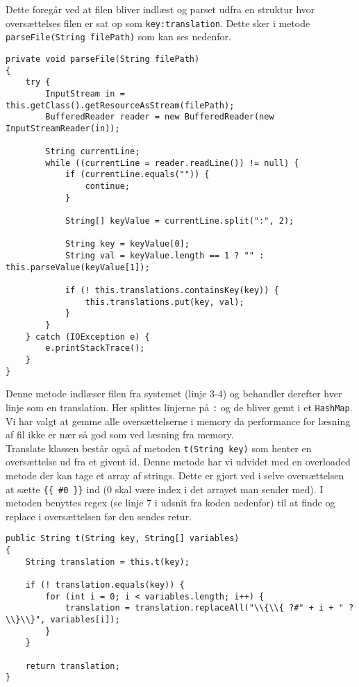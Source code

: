\noindent Dette foregår ved at filen bliver indlæst og parset udfra en struktur hvor oversættelses filen er sat op som \lstinline{key:translation}.
Dette sker i metode \lstinline{parseFile(String filePath)} som kan ses nedenfor.

\begin{lstlisting}
private void parseFile(String filePath)
{
    try {
        InputStream in = this.getClass().getResourceAsStream(filePath);
        BufferedReader reader = new BufferedReader(new InputStreamReader(in));

        String currentLine;
        while ((currentLine = reader.readLine()) != null) {
            if (currentLine.equals("")) {
                continue;
            }

            String[] keyValue = currentLine.split(":", 2);

            String key = keyValue[0];
            String val = keyValue.length == 1 ? "" : this.parseValue(keyValue[1]);

            if (! this.translations.containsKey(key)) {
                this.translations.put(key, val);
            }
        }
    } catch (IOException e) {
        e.printStackTrace();
    }
}
\end{lstlisting}
\vspace{2ex}

\noindent Denne metode indlæser filen fra systemet (linje 3-4) og behandler derefter hver linje som en translation.
Her splittes linjerne på \lstinline{:} og de bliver gemt i et \lstinline{HashMap}.
Vi har valgt at gemme alle oversættelserne i memory da performance for læsning af fil ikke er nær så god som ved læsning fra memory.
\\

\noindent Translate klassen består også af metoden \lstinline{t(String key)} som henter en oversættelse ud fra et givent id.
Denne metode har vi udvidet med en overloaded metode der kan tage et array af strings.
Dette er gjort ved i selve oversættelsen at sætte \lstinline!{{ #0 }}! ind (0 skal være index i det arrayet man sender med).
I metoden benyttes regex (se linje 7 i udsnit fra koden nedenfor) til at finde og replace i oversættelsen før den sendes retur.

\begin{lstlisting}
public String t(String key, String[] variables)
{
    String translation = this.t(key);

    if (! translation.equals(key)) {
        for (int i = 0; i < variables.length; i++) {
            translation = translation.replaceAll("\\{\\{ ?#" + i + " ?\\}\\}", variables[i]);
        }
    }

    return translation;
}
\end{lstlisting}
\vspace{2ex}